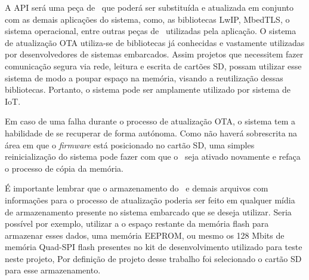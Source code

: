 A API será uma peça de \software\ que poderá ser substituída e atualizada em conjunto com as demais aplicações do sistema, como, as bibliotecas LwIP, MbedTLS, o sistema operacional, entre outras peças de \software\ utilizadas pela aplicação. 
O sistema de atualização OTA utiliza-se de bibliotecas já conhecidas e vastamente utilizadas por desenvolvedores de sistemas embarcados. Assim projetos que necessitem fazer comunicação segura via rede, leitura e escrita de cartões SD, possam utilizar esse sistema de modo a poupar espaço na memória, visando a reutilização dessas bibliotecas. Portanto, o sistema pode ser amplamente utilizado por sistema de IoT. 

Em caso de uma falha durante o processo de atualização OTA, o sistema tem a habilidade de se recuperar de forma autónoma. Como não haverá sobrescrita na área em que o \textit{firmware} está posicionado no cartão SD, uma simples reinicialização do sistema pode fazer com que o \bootloader\ seja ativado novamente e refaça o processo de cópia da memória.

É importante lembrar que o armazenamento do \firmware\ e demais arquivos com informações para o processo de atualização poderia ser feito em qualquer mídia de armazenamento presente no sistema embarcado que se deseja utilizar. Seria possível por exemplo, utilizar a o espaço restante da memória flash para armazenar esses dados, uma memória EEPROM, ou mesmo os 128 Mbits de memória Quad-SPI flash presentes no kit de desenvolvimento utilizado para teste neste projeto, Por definição de projeto desse trabalho foi selecionado o cartão SD para esse armazenamento.



